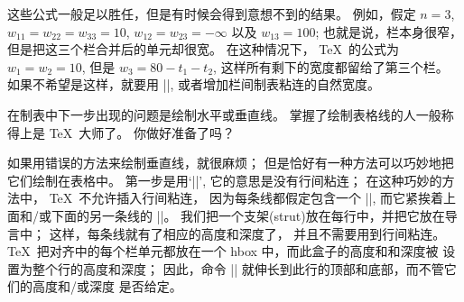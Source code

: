 {{%
\ddanger 这些公式一般足以胜任，但是有时候会得到意想不到的结果。%
例如，假定 $n=3$, $w_{11}=w_{22}=w_{33}
=10$, $w_{12}=w_{23}=-\infty$ 以及 $w_{13}=100$;
也就是说，栏本身很窄，但是把这三个栏合并后的单元却很宽。%
在这种情况下， \TeX\ 的公式为 $w_1=w_2=10$, 但是 $w_3=80-t_1-t_2$,
这样所有剩下的宽度都留给了第三个栏。%
如果不希望是这样，就要用 |\hidewidth|, 或者增加栏间制表粘连的自然宽度。

\ddanger 在制表中下一步出现的问题是绘制水平或垂直线。%
掌握了绘制表格线的人一般称得上是 \TeX\ 大师了。%
你做好准备了吗？

\ddanger 如果用错误的方法来绘制垂直线，就很麻烦；
但是恰好{有}一种方法可以巧妙地把它们绘制在表格中。%
第一步是用`|\offinterlineskip|', 它的意思是没有行间粘连；
在这种巧妙的方法中， \TeX\ 不允许插入行间粘连，
因为每条线都假定包含一个 |\vrule|, 而它紧挨着上面和/或下面的另一条线的 |\vrule|。%
我们把一个支架(strut)放在每行中，并把它放在导言中；
这样，每条线就有了相应的高度和深度了，
并且不需要用到行间粘连。%
 \TeX\ 把对齐中的每个栏单元都放在一个 hbox 中，而此盒子的高度和和深度被%
设置为整个行的高度和深度；
\1因此，命令 |\vrule| 就伸长到此行的顶部和底部，而不管它们的高度和/或深度%
是否给定。

}}
